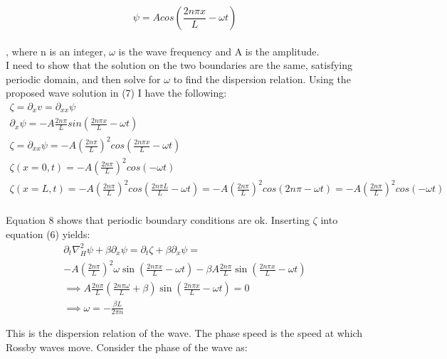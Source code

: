 \begin{equation}
\psi = Acos(\frac{2n\pi x}{L}-\omega t)
\end{equation}\\

, where n is an integer, $\omega$ is the wave frequency and A is the amplitude.\\

I need to show that the solution on the two boundaries are the same, satisfying periodic domain, and then solve for $\omega$ to find the dispersion relation. Using the proposed wave solution in (7) I have the following:\\

\begin{equation}
\begin{gathered}
\zeta = \partial_xv = \partial_{xx}\psi\\
\partial_x\psi = -A\frac{2n\pi}{L}sin(\frac{2n\pi x}{L}-\omega t)\\
\zeta = \partial_{xx}\psi = -A(\frac{2n\pi}{L})^2cos(\frac{2n\pi x}{L}-\omega t)\\
\zeta(x=0,t) = -A(\frac{2n\pi}{L})^2cos(-\omega t)\\
\zeta(x=L,t) = -A(\frac{2n\pi}{L})^2cos(\frac{2n\pi L}{L}-\omega t) = -A(\frac{2n\pi}{L})^2cos(2n\pi-\omega t) = -A(\frac{2n\pi}{L})^2cos(-\omega t)\\
\end{gathered}
\end{equation}

Equation 8 shows that periodic boundary conditions are ok. Inserting $\zeta$ into equation (6) yields:\\

\begin{equation}
\begin{gathered}
\partial_t\nabla^2_H\psi + \beta\partial_x\psi = \partial_t\zeta + \beta\partial_x\psi =\\
-A(\frac{2n\pi}{L})^2\omega \sin(\frac{2n\pi x}{L}-\omega t) - \beta A\frac{2n\pi}{L}\sin(\frac{2n\pi x}{L}-\omega t)\\
\implies A\frac{2n\pi}{L}(\frac{2n\pi \omega}{L}+\beta)\sin(\frac{2n\pi x}{L}-\omega t) = 0\\
\implies \omega = -\frac{\beta L}{2\pi n}
\end{gathered}
\end{equation}

This is the dispersion relation of the wave. The phase speed is the speed at which Rossby waves move. Consider the phase of the wave as:\\

